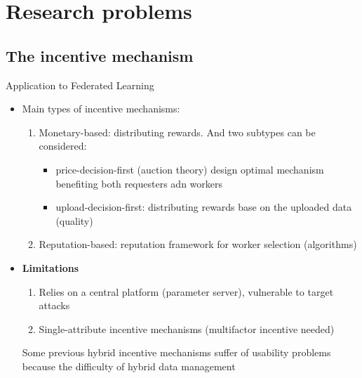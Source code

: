 

\section{Research problems}

\subsection{The incentive mechanism}

\begin{frame}{Application to Federated Learning}
  \begin{itemize}
    \item Main types of incentive mechanisms:
          \begin{enumerate}
            \item \alert{Monetary-based}: distributing rewards. And two subtypes can be considered:%
            	\begin{itemize}
            	\item \alert{price-decision-first} (auction theory) design optimal mechanism benefiting both requesters adn workers
            	\item \alert{upload-decision-first}: distributing rewards base on the uploaded data (quality)
          		\end{itemize}
            \item \alert{Reputation-based}: reputation framework for worker selection (algorithms)
          \end{enumerate}
    \item \textbf{Limitations}
    	\begin{enumerate}
            \item Relies on a central platform (parameter server), vulnerable to target attacks
            \item Single-attribute incentive mechanisms (multifactor incentive needed)
          \end{enumerate}
     Some previous hybrid incentive mechanisms suffer of usability problems because the difficulty of hybrid data management%
  \end{itemize}
\end{frame}

